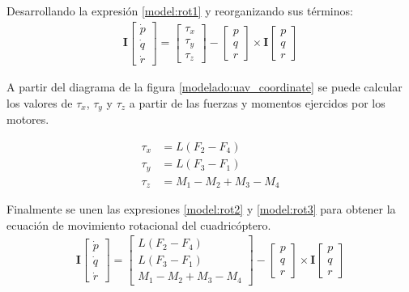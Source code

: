 Desarrollando la expresión \ref{model:rot1} y reorganizando sus términos:
\begin{align}
\mathbf{I}\begin{bmatrix}
	\dot{p}\\
	\dot{q}\\
	\dot{r}
\end{bmatrix}=
\begin{bmatrix}
	\tau_x\\
	\tau_y\\
	\tau_z
\end{bmatrix} -\begin{bmatrix}
	p\\
	q\\
	r
\end{bmatrix} \times\mathbf{I}\begin{bmatrix}
	p\\
	q\\
	r
\end{bmatrix}\label{model:rot2}
\end{align}

A partir del diagrama de la figura \ref{modelado:uav_coordinate} se puede calcular los valores de $\tau_x$, $\tau_y$ y $\tau_z$ a partir de las fuerzas y momentos ejercidos por los motores.

\begin{align}
	\tau_x &=  L (F_2-F_4)\nonumber\\
	\tau_y &=  L (F_3-F_1)\nonumber\\
	\tau_z &=  M_1 - M_2 + M_3 - M_4\label{model:rot3}
\end{align}

Finalmente se unen las expresiones \ref{model:rot2} y \ref{model:rot3} para obtener la ecuación de movimiento rotacional del cuadricóptero.
\begin{align}
	\label{model:rot_eq}
	\mathbf{I}\begin{bmatrix}
		\dot{p}\\
		\dot{q}\\
		\dot{r}
	\end{bmatrix}=\left[
	\begin{array}{c}
		L (F_2-F_4)\\
		L (F_3-F_1)\\
		M_1 - M_2 + M_3 - M_4
	\end{array}\right] -\begin{bmatrix}
		p\\
		q\\
		r
	\end{bmatrix} \times\mathbf{I}\begin{bmatrix}
		p\\
		q\\
		r
	\end{bmatrix}
\end{align}

